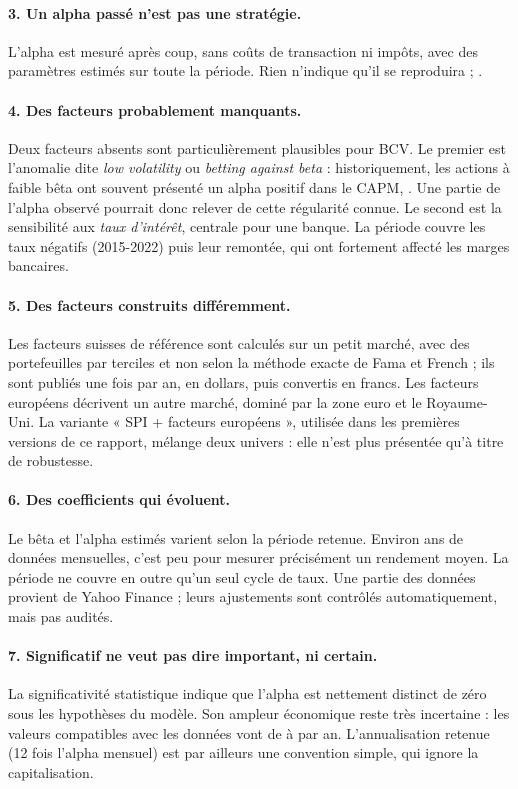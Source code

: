 \documentclass[11pt,a4paper]{article}
\begin{document}
\paragraph{3. Un alpha passé n'est pas une stratégie.} L'alpha est mesuré après coup, sans coûts de transaction ni impôts, avec des paramètres estimés sur toute la période. Rien n'indique qu'il se reproduira ; \RollLimite.

\paragraph{4. Des facteurs probablement manquants.} \RDeuxLimite{} Deux facteurs absents sont particulièrement plausibles pour BCV. Le premier est l'anomalie dite \emph{low volatility} ou \emph{betting against beta} : historiquement, les actions à faible bêta ont souvent présenté un alpha positif dans le CAPM, \LowVolPhrase{}. Une partie de l'alpha observé pourrait donc relever de cette régularité connue. Le second est la sensibilité aux \emph{taux d'intérêt}, centrale pour une banque. La période couvre les taux négatifs (2015-2022) puis leur remontée, qui ont fortement affecté les marges bancaires.

\paragraph{5. Des facteurs construits différemment.} Les facteurs suisses de référence sont calculés sur un petit marché, avec des portefeuilles par terciles et non selon la méthode exacte de Fama et French ; ils sont publiés une fois par an, en dollars, puis convertis en francs. Les facteurs européens décrivent un autre marché, dominé par la zone euro et le Royaume-Uni. La variante « SPI + facteurs européens », utilisée dans les premières versions de ce rapport, mélange deux univers : elle n'est plus présentée qu'à titre de robustesse.

\paragraph{6. Des coefficients qui évoluent.} Le bêta et l'alpha estimés varient selon la période retenue. Environ \Annees{} ans de données mensuelles, c'est peu pour mesurer précisément un rendement moyen. La période ne couvre en outre qu'un seul cycle de taux. Une partie des données provient de Yahoo Finance ; leurs ajustements sont contrôlés automatiquement, mais pas audités.

\paragraph{7. Significatif ne veut pas dire important, ni certain.} La significativité statistique indique que l'alpha est nettement distinct de zéro sous les hypothèses du modèle. Son ampleur économique reste très incertaine : les valeurs compatibles avec les données vont de \AlphaALo{} à \AlphaAHi{} par an. L'annualisation retenue (12 fois l'alpha mensuel) est par ailleurs une convention simple, qui ignore la capitalisation.
\end{document}
